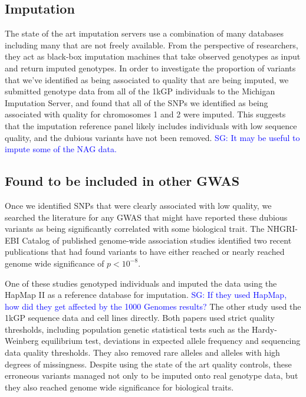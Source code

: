 \documentclass[9pt,lineno]{elife}
\newcommand{\sgcomment}[1]{\textcolor{blue}{SG: #1}}
\newcommand{\luke}[1]{\textcolor{blue}{Luke: #1}}
\begin{document}
\subsection{Imputation}
The state of the art imputation servers use a combination of many databases including many that are not freely available.
From the perspective of researchers, they act as black-box imputation machines that take observed genotypes as input and return imputed genotypes.  
In order to investigate the proportion of variants that we've identified as being associated to quality that are being imputed, we submitted genotype data from all of the 1kGP individuals to the Michigan Imputation Server, and found that all of the SNPs we identified as being associated with quality for chromosomes 1 and 2 were imputed. This suggests that the imputation reference panel likely includes individuals with low sequence quality, and the dubious variants have not been removed. 
\sgcomment{It may be useful to impute some of the NAG data.} 


\subsection{Found to be included in other GWAS }
Once we identified SNPs that were clearly associated with low quality, we searched the literature for any GWAS that might have reported these dubious variants as being significantly correlated with some biological trait. 
The NHGRI-EBI Catalog of published genome-wide association studies identified two recent publications that had found variants to have either reached or nearly reached genome wide significance of $ p < 10^{-8}$.

One of these studies genotyped individuals and imputed the data using the HapMap II as a reference  database for imputation. \sgcomment{If they used HapMap, how did they get affected by the 1000 Genomes results?}
The other study used the 1kGP sequence data and cell lines directly.
Both papers used strict quality thresholds, including population genetic statistical tests such as the Hardy-Weinberg equilibrium test, deviations in expected allele frequency and sequencing data quality thresholds. 
They also removed rare alleles and alleles with high degrees of missingness. 
Despite using the state of the art quality controls, these erroneous variants managed not only to be imputed onto real genotype data, but they also reached genome wide significance for biological traits.
\end{document}
